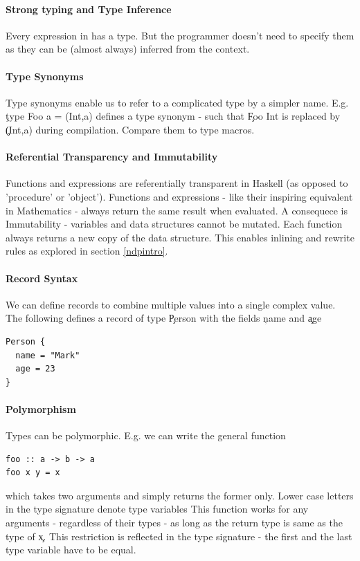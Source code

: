   \paragraph{Strong typing and Type Inference}
    Every expression in has a type. But the programmer doesn't need to
    specify them as they can be (almost always) inferred from the context.
  \paragraph{Type Synonyms}
    Type synonyms enable us to refer to a complicated type by a simpler name.
    E.g. \c{type Foo a = (Int,a)} defines a type synonym - such that
    \c{Foo Int} is replaced by \c{(Int,a)} during compilation. Compare them to
    type macros.
  
  \paragraph{Referential Transparency and Immutability}
    Functions and expressions are referentially transparent in Haskell 
    (as opposed to 'procedure' or 'object').
    Functions and expressions - like their inspiring equivalent in
    Mathematics - always return the same result when evaluated.
    A consequece is Immutability - variables and data structures
    cannot be mutated. Each function always returns a new copy
    of the data structure. This enables inlining and rewrite rules
    as explored in section \ref{ndpintro}.
    
  \paragraph{Record Syntax}
    We can define records to combine multiple values into a single complex value.
    The following defines a record of type \c{Person} with the
    fields \c{name} and \c{age}
    \begin{lstlisting}
Person {
  name = "Mark"
  age = 23
}
    \end{lstlisting}
    
  \paragraph{Polymorphism}
    Types can be polymorphic. E.g. we can write the general function
    \begin{lstlisting}
foo :: a -> b -> a
foo x y = x
    \end{lstlisting}
    which takes two arguments and simply returns the former only.
    Lower case letters in the type signature denote type variables
    This function works for any arguments - regardless of their types -
    as long as the return type is same as the type of \c{x}. This
    restriction is reflected in the type signature - the first and
    the last type variable have to be equal.
    
